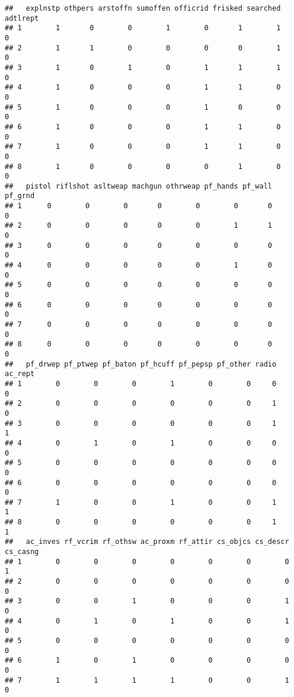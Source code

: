 \documentclass[]{article}
\begin{document}
\begin{verbatim}
##   explnstp othpers arstoffn sumoffen officrid frisked searched adtlrept
## 1        1       0        0        1        0       1        1        0
## 2        1       1        0        0        0       0        1        0
## 3        1       0        1        0        1       1        1        0
## 4        1       0        0        0        1       1        0        0
## 5        1       0        0        0        1       0        0        0
## 6        1       0        0        0        1       1        0        0
## 7        1       0        0        0        1       1        0        0
## 8        1       0        0        0        0       1        0        0
##   pistol riflshot asltweap machgun othrweap pf_hands pf_wall pf_grnd
## 1      0        0        0       0        0        0       0       0
## 2      0        0        0       0        0        1       1       0
## 3      0        0        0       0        0        0       0       0
## 4      0        0        0       0        0        1       0       0
## 5      0        0        0       0        0        0       0       0
## 6      0        0        0       0        0        0       0       0
## 7      0        0        0       0        0        0       0       0
## 8      0        0        0       0        0        0       0       0
##   pf_drwep pf_ptwep pf_baton pf_hcuff pf_pepsp pf_other radio ac_rept
## 1        0        0        0        1        0        0     0       0
## 2        0        0        0        0        0        0     1       0
## 3        0        0        0        0        0        0     1       1
## 4        0        1        0        1        0        0     0       0
## 5        0        0        0        0        0        0     0       0
## 6        0        0        0        0        0        0     0       0
## 7        1        0        0        1        0        0     1       1
## 8        0        0        0        0        0        0     1       1
##   ac_inves rf_vcrim rf_othsw ac_proxm rf_attir cs_objcs cs_descr cs_casng
## 1        0        0        0        0        0        0        0        1
## 2        0        0        0        0        0        0        0        0
## 3        0        0        1        0        0        0        1        0
## 4        0        1        0        1        0        0        1        0
## 5        0        0        0        0        0        0        0        0
## 6        1        0        1        0        0        0        0        0
## 7        1        1        1        1        0        0        1        0

\end{verbatim}
\end{document}
